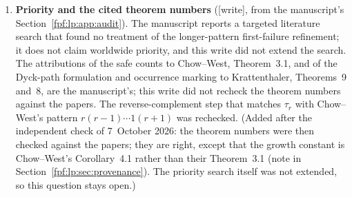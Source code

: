 \documentclass[11pt]{article}
\numberwithin{equation}{section}
\theoremstyle{definition}
\begin{document}
\begin{enumerate}[leftmargin=*,label=\textbf{\arabic*.}]
\item \textbf{Priority and the cited theorem numbers}
(\textsf{[write]}, from the manuscript's Section~\ref{fpf:lp:app:audit}).
The manuscript reports a targeted literature search that found no
treatment of the longer-pattern first-failure refinement; it does not claim
worldwide priority, and this write did not extend the search. The
attributions of the safe counts to Chow--West, Theorem~3.1, and of the
Dyck-path formulation and occurrence marking to Krattenthaler, Theorems~9
and~8, are the manuscript's; this write did not recheck the theorem numbers
against the papers. The reverse-complement step that matches \(\tau_r\)
with Chow--West's pattern \(r(r-1)\cdots1(r+1)\) was rechecked.
\textup{(Added after the independent check of 7~October 2026: the theorem
numbers were then checked against the papers; they are right, except that
the growth constant is Chow--West's Corollary~4.1 rather than their
Theorem~3.1 (note in Section~\ref{fpf:lp:sec:provenance}). The priority
search itself was not extended, so this question stays open.)}
\end{enumerate}
\end{document}
